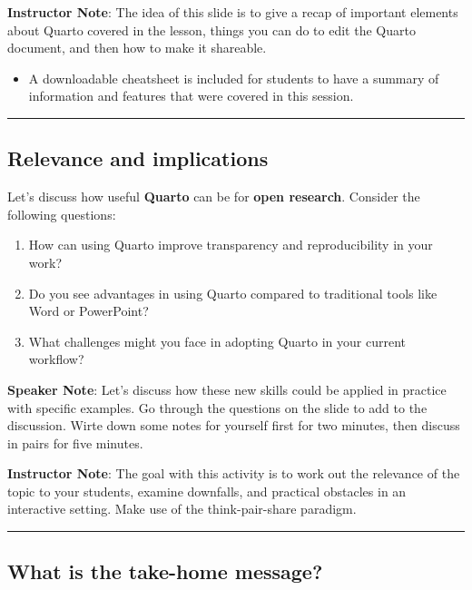 \documentclass[
  letterpaper,
  DIV=11,
  numbers=noendperiod]{scrartcl}
\providecommand{\tightlist}{%
  \setlength{\itemsep}{0pt}\setlength{\parskip}{0pt}}
\begin{document}
\textbf{Instructor Note}: The idea of this slide is to give a recap of
important elements about Quarto covered in the lesson, things you can do
to edit the Quarto document, and then how to make it shareable.

\begin{itemize}
\tightlist
\item
  A downloadable cheatsheet is included for students to have a summary
  of information and features that were covered in this session.
\end{itemize}

\begin{center}\rule{0.5\linewidth}{0.5pt}\end{center}

\subsection{Relevance and
implications}\label{relevance-and-implications}

Let's discuss how useful \textbf{Quarto} can be for \textbf{open
research}. Consider the following questions:

\begin{enumerate}
\def\labelenumi{\arabic{enumi}.}
\tightlist
\item
  How can using Quarto improve transparency and reproducibility in your
  work?
\item
  Do you see advantages in using Quarto compared to traditional tools
  like Word or PowerPoint?
\item
  What challenges might you face in adopting Quarto in your current
  workflow?
\end{enumerate}

\textbf{Speaker Note}: Let's discuss how these new skills could be
applied in practice with specific examples. Go through the questions on
the slide to add to the discussion. Wirte down some notes for yourself
first for two minutes, then discuss in pairs for five minutes.

\textbf{Instructor Note}: The goal with this activity is to work out the
relevance of the topic to your students, examine downfalls, and
practical obstacles in an interactive setting. Make use of the
think-pair-share paradigm.

\begin{center}\rule{0.5\linewidth}{0.5pt}\end{center}

\subsection{What is the take-home
message?}\label{what-is-the-take-home-message}
\end{document}
